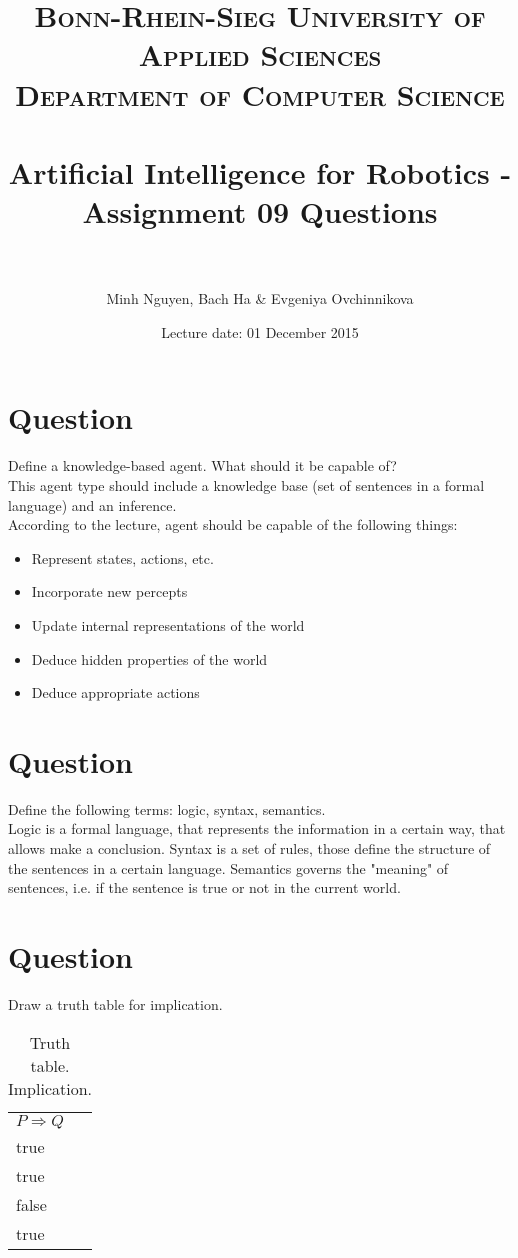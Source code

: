 \documentclass[paper=a4, fontsize=11pt]{scrartcl} %
\title{	
\normalfont \normalsize 
\textsc{Bonn-Rhein-Sieg University of Applied Sciences \\Department of Computer Science} \\ [10pt] %
\horrule{0.5pt} \\[0.4cm] %
\LARGE Artificial Intelligence for Robotics - Assignment 09 Questions \\ %
\horrule{2pt} \\[0.5cm] %
}
\author{Minh Nguyen, Bach Ha \& Evgeniya Ovchinnikova} %
\date{Lecture date: 01 December 2015}
\begin{document}
\maketitle %


\section{Question}

Define a knowledge-based agent. What should it be capable of?\\

This agent type should include a knowledge base (set of sentences in a formal language) and an inference.\\

According to the lecture, agent should be capable of the following things:
\begin{itemize}
\item Represent states, actions, etc.
\item Incorporate new percepts
\item Update internal representations of the world
\item Deduce hidden properties of the world
\item Deduce appropriate actions
\end{itemize}

\section{Question}
Define the following terms: logic, syntax, semantics.\\

Logic is a formal language, that represents the information in a certain way, that allows make a conclusion.
Syntax is a set of rules, those define the structure of the sentences in a certain language.
Semantics governs the "meaning" of sentences, i.e. if the sentence is true or not in the current world.

\section{Question}

Draw a truth table for implication.

\begin{table}[h!]
\centering
\caption{Truth table. Implication.}
\label{my-label}
\begin{tabular}{l}
 $P \Rightarrow Q$  \\
  true  \\
  true   \\
 false \\
 true
\end{tabular}
\end{table}
\end{document}
